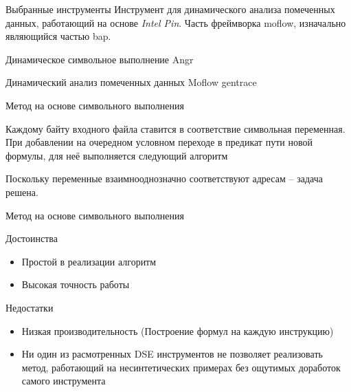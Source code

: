 \documentclass[10pt]{beamer}
\begin{document}
\begin{frame}{Выбранные инструменты}
    Инструмент для динамического анализа помеченных данных, работающий на основе \emph{Intel Pin}.
    Часть фреймворка moflow, изначально являющийся частью bap.
    \begin{block}{Динамическое символьное выполнение}
      Angr
    \end{block}
    \begin{block}{Динамический анализ помеченных данных}
        Moflow gentrace
    \end{block}
\end{frame}


\begin{frame}{Метод на основе символьного выполнения}

Каждому байту входного файла ставится в соответствие символьная переменная.
При добавлении на очередном условном переходе в предикат пути новой формулы, для неё выполняется следующий алгоритм

\begin{algorithm}[H]
\SetAlgoLined
{}
  \caption{Метод на основе символьного выполнения}
\end{algorithm}
Поскольку переменные взаимнооднозначно соответствуют адресам -- задача решена.
\end{frame}

\begin{frame}{Метод на основе символьного выполнения}

  \begin{block}{Достоинства}
    \begin{itemize}
      \item Простой в реализации алгоритм
      \item Высокая точность работы
    \end{itemize}
  \end{block}
  \pause
  \begin{block}{Недостатки}
    \begin{itemize}
      \item Низкая производительность (Построение формул на каждую инструкцию)
      \item Ни один из расмотренных DSE инструментов не позволяет реализовать метод, работающий на несинтетических примерах без ощутимых доработок самого инструмента
    \end{itemize}
  \end{block}

\end{frame}
\end{document}
